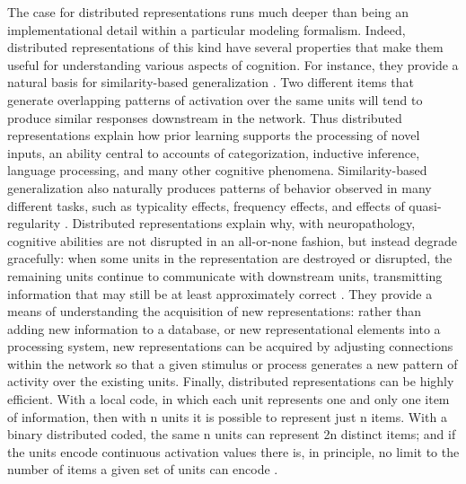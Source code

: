 The case for distributed representations runs much deeper than being an implementational detail within a particular modeling formalism. Indeed, distributed representations of this kind have several properties that make them useful for understanding various aspects of cognition. For instance, they provide a natural basis for similarity-based generalization \cite{hinton_distributed_1984}. Two different items that generate overlapping patterns of activation over the same units will tend to produce similar responses downstream in the network. Thus distributed representations explain how prior learning supports the processing of novel inputs, an ability central to accounts of categorization, inductive inference, language processing, and many other cognitive phenomena. Similarity-based generalization also naturally produces patterns of behavior observed in many different tasks, such as typicality effects, frequency effects, and effects of quasi-regularity \cite{plaut_understanding_1996-1, rogers_object_2003}. Distributed representations explain why, with neuropathology, cognitive abilities are not disrupted in an all-or-none fashion, but instead degrade gracefully: when some units in the representation are destroyed or disrupted, the remaining units continue to communicate with downstream units, transmitting information that may still be at least approximately correct \cite{devlin_category-specific_1998,rogers_structure_2004}. They provide a means of understanding the acquisition of new representations: rather than adding new information to a database, or new representational elements into a processing system, new representations can be acquired by adjusting connections within the network so that a given stimulus or process generates a new pattern of activity over the existing units. Finally, distributed representations can be highly efficient. With a local code, in which each unit represents one and only one item of information, then with n units it is possible to represent just n items. With a binary distributed coded, the same n units can represent 2n distinct items; and if the units encode continuous activation values there is, in principle, no limit to the number of items a given set of units can encode \cite{hinton_distributed_1984}.


